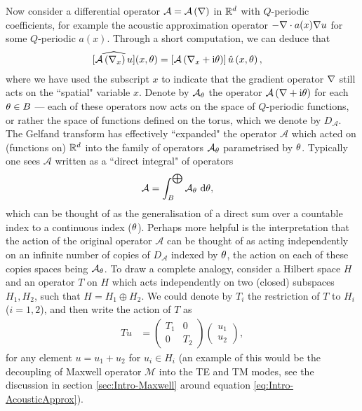 Now consider a differential operator $\mathcal{A} = \mathcal{A}\left( \nabla \right)$ in $\mathbb{R}^d$ with $Q$-periodic coefficients, for example the acoustic approximation operator $-\nabla\cdot a(x)\nabla u$ for some $Q$-periodic $a(x)$.
Through a short computation, we can deduce that
\begin{align*}
	\widehat{\left[ \mathcal{A}\left( \nabla_x \right)u \right]}(x,\theta) &= \left[ \mathcal{A}\left( \nabla_x + \mathrm{i}\theta \right) \right]\hat{u}\left( x,\theta \right),
\end{align*}
where we have used the subscript $x$ to indicate that the gradient operator $\nabla$ still acts on the ``spatial" variable $x$.
Denote by $\mathcal{A}_{\theta}$ the operator $\mathcal{A}\left( \nabla+\mathrm{i}\theta \right)$ for each $\theta\in B$ --- each of these operators now acts on the space of $Q$-periodic functions, or rather the space of functions defined on the torus, which we denote by $D_{\mathcal{A}}$.
The Gelfand transform has effectively ``expanded" the operator $\mathcal{A}$ which acted on (functions on) $\mathbb{R}^d$ into the family of operators $\mathcal{A}_{\theta}$ parametrised by $\theta$.
Typically one sees $\mathcal{A}$ written as a ``direct integral" of operators
\begin{align*}
	\mathcal{A} &= \int_{B}^{\bigoplus}\mathcal{A}_{\theta} \ \mathrm{d}\theta,
\end{align*}
 which can be thought of as the generalisation of a direct sum over a countable index to a continuous index ($\theta$).
Perhaps more helpful is the interpretation that the action of the original operator $\mathcal{A}$ can be thought of as acting independently on an infinite number of copies of $D_{\mathcal{A}}$ indexed by $\theta$, the action on each of these copies spaces being $\mathcal{A}_{\theta}$.
To draw a complete analogy, consider a Hilbert space $H$ and an operator $T$ on $H$ which acts independently on two (closed) subspaces $H_1, H_2$, such that $H = H_1 \oplus H_2$.
We could denote by $T_i$ the restriction of $T$ to $H_i$ ($i=1,2$), and then write the action of $T$ as
\begin{align*}
	Tu &= \begin{pmatrix} T_1 & 0 \\ 0 & T_2 \end{pmatrix}
	\begin{pmatrix} u_1 \\ u_2	\end{pmatrix},
\end{align*}
for any element $u = u_1 + u_2$ for $u_i\in H_i$ (an example of this would be the decoupling of Maxwell operator $\mathcal{M}$ into the TE and TM modes, see the discussion in section \ref{sec:Intro-Maxwell} around equation \eqref{eq:Intro-AcousticApprox}).
